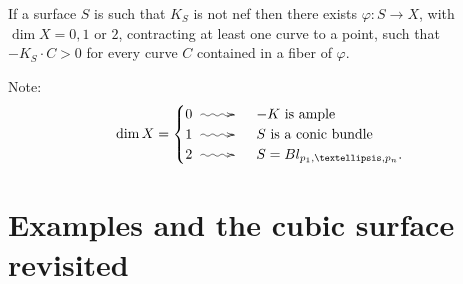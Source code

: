 \begin{theorem}
\label{theorem-two}
If a surface $S$ is such that
$K_S$ is not nef then there exists $\varphi:S
\to X$,
with $\dim X=0,1$ or $2$, contracting at
least
one curve to a point, such that
$-K_S\cdot C>0$ for every curve $C$ contained
in a fiber of $\varphi$.
\end{theorem}

Note:
$$
\dim X=
\begin{cases}
0\xymatrix{\ar@{~>}[r]&}&-K \text{ is
ample}\\
1\xymatrix{\ar@{~>}[r]&}&S \text{ is a conic
bundle}\\
2\xymatrix{\ar@{~>}[r]&}& S=Bl_{p_1,…,p_n}.
\end{cases}
$$


\section{Examples and the cubic surface
revisited}
\label{section-examples-and-cubic}

